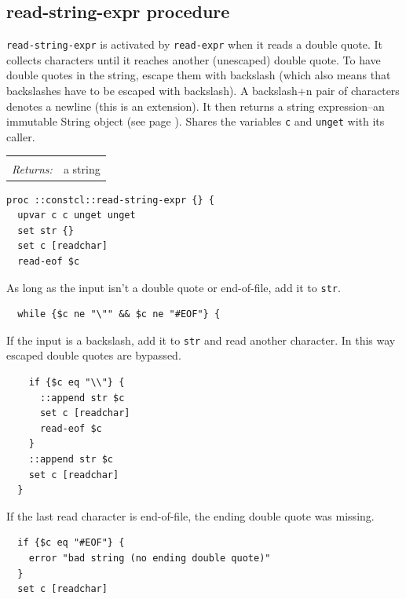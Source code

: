 \documentclass[twoside]{report}
\begin{document}
\subsection{read-string-expr procedure}
\label{readstringexpr-procedure}

\texttt{read-string-expr} is activated by \texttt{read-expr} when it reads a double quote. It collects characters until it reaches another (unescaped) double quote. To have double quotes in the string, escape them with backslash (which also means that backslashes have to be escaped with backslash). A backslash+n pair of characters denotes a newline (this is an extension). It then returns a string expression--an immutable String object (see page \pageref{strings}). Shares the variables \texttt{c} and \texttt{unget} with its caller.

\noindent\begin{tabular}{ |p{1.9cm} p{8cm}| }
\hline
\rowcolor[HTML]{CCCCCC} \multicolumn{2}{|l|}{\bf read-string-expr (internal)} \\
\textit{Returns:} & a string \\
\hline
\end{tabular}

\begin{lstlisting}
proc ::constcl::read-string-expr {} {
  upvar c c unget unget
  set str {}
  set c [readchar]
  read-eof $c
\end{lstlisting}

As long as the input isn't a double quote or end-of-file, add it to \texttt{str}.

\begin{lstlisting}
  while {$c ne "\"" && $c ne "#EOF"} {
\end{lstlisting}

If the input is a backslash, add it to \texttt{str} and read another character. In this way escaped double quotes are bypassed.

\begin{lstlisting}
    if {$c eq "\\"} {
      ::append str $c
      set c [readchar]
      read-eof $c
    }
    ::append str $c
    set c [readchar]
  }
\end{lstlisting}

If the last read character is end-of-file, the ending double quote was missing.

\begin{lstlisting}
  if {$c eq "#EOF"} {
    error "bad string (no ending double quote)"
  }
  set c [readchar]
\end{lstlisting}
\end{document}
